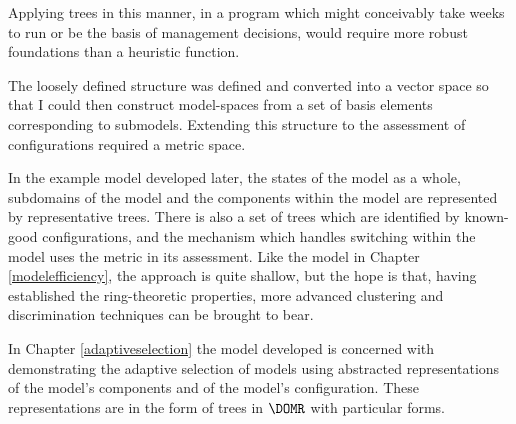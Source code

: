 Applying trees in this manner, in a program which might conceivably
take weeks to run or be the basis of management decisions, would
require more robust foundations than a heuristic function.

The loosely defined structure was defined and converted into a vector
space so that I could then construct model-spaces from a set of basis
elements corresponding to submodels. Extending this structure to the
assessment of configurations required a metric space.

In the example model developed later, the states of the model as a
whole, subdomains of the model and the components within the model are
represented by representative trees.  There is also a set of trees
which are identified by known-good configurations, and the
mechanism which handles switching within the model uses the metric in
its assessment.  Like the model in Chapter \ref{modelefficiency}, the
approach is quite shallow, but the hope is that, having established
the ring-theoretic properties, more advanced clustering and
discrimination techniques can be brought to bear.

In Chapter \ref{adaptiveselection} the model developed is concerned with
demonstrating the adaptive selection of models using abstracted
representations of the model's components and of the model's
configuration. These representations are in the form of trees in
$\DOMR$ with particular forms.






